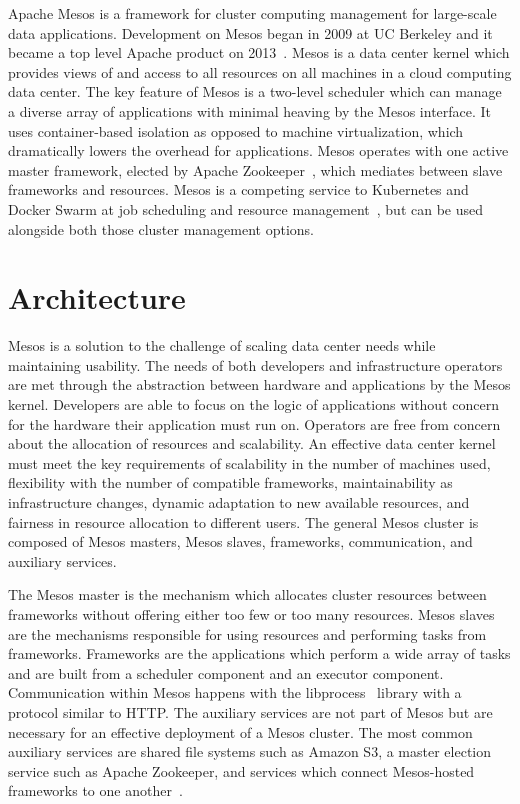Apache Mesos is a framework for cluster computing management for large-scale data applications. Development on Mesos began in 2009 at UC Berkeley and it became a top level Apache product on 2013~\cite{Kakadia2015}. Mesos is a data center kernel which provides views of and access to all resources on all machines in a cloud computing data center. The key feature of Mesos is a two-level scheduler which can manage a diverse array of applications with minimal heaving by the Mesos interface. It uses container-based isolation as opposed to machine virtualization, which dramatically lowers the overhead for applications. Mesos operates with one active master framework, elected by Apache Zookeeper~\cite{Winder15}, which mediates between slave frameworks and resources. Mesos is a competing service to Kubernetes and Docker Swarm at job scheduling and resource management~\cite{Ivanovic2016}, but can be used alongside both those cluster management options. 

\section{Architecture}

Mesos is a solution to the challenge of scaling data center needs while maintaining usability. The needs of both developers and infrastructure operators are met through the abstraction between hardware and applications by the Mesos kernel. Developers are able to focus on the logic of applications without concern for the hardware their application must run on. Operators are free from concern about the allocation of resources and scalability. An effective data center kernel must meet the key requirements of scalability in the number of machines used, flexibility with the number of compatible frameworks, maintainability as infrastructure changes, dynamic adaptation to new available resources, and fairness in resource allocation to different users. The general Mesos cluster is composed of Mesos masters, Mesos slaves, frameworks, communication, and auxiliary services.

The Mesos master is the mechanism which allocates cluster resources between frameworks without offering either too few or too many resources. 
Mesos slaves are the mechanisms responsible for using resources and performing tasks from frameworks. Frameworks are the applications which perform a wide array of tasks and are built from a scheduler component and an executor component. Communication within Mesos happens with the libprocess~\cite{Kakadia2015} library with a protocol similar to HTTP. The auxiliary services are not part of Mesos but are necessary for an effective deployment of a Mesos cluster. The most common auxiliary services are shared file systems such as Amazon S3, a master election service such as Apache Zookeeper, and services which connect Mesos-hosted frameworks to one another~\cite{Denman2017}.

